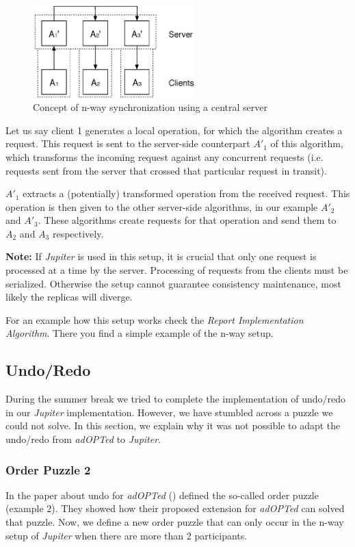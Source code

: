 \begin{figure}[htb]
 \centering
 \includegraphics[width=6.31cm,height=3.56cm]{../images/finalreport/algorithm_nway-details.eps}
 \caption{Concept of n-way synchronization using a central server}
 \label{fig:algorithm.nway-details}
\end{figure}

Let us say client 1 generates a local operation, for which the algorithm
creates a request. This request is sent to the server-side counterpart $A'_1$ of
this algorithm, which transforms the incoming request against any concurrent
requests (i.e. requests sent from the server that crossed that particular 
request in transit).

$A'_1$ extracts a (potentially) transformed operation from the received 
request. This operation is then given to the other server-side algorithms,
in our example $A'_2$ and $A'_3$. These algorithms create
requests for that operation and send them to $A_2$ and $A_3$ respectively.

\textbf{Note:} If \emph{Jupiter} is used in this setup, it is crucial that
only one request is processed at a time by the server. Processing of
requests from the clients must be serialized. Otherwise the setup cannot
guarantee consistency maintenance, most likely the replicas will diverge.

For an example how this setup works check the 
\emph{Report Implementation Algorithm}. There you find a simple example
of the n-way setup.


\subsection{Undo/Redo}
\label{sect:algorithm.undoredo}
During the summer break we tried to complete the implementation of undo/redo
in our \emph{Jupiter} implementation. However, we have stumbled across
a puzzle we could not solve. In this section, we explain why it was
not possible to adapt the undo/redo from \emph{adOPTed} to \emph{Jupiter}.

\subsubsection{Order Puzzle 2}
In the paper about undo for \emph{adOPTed} (\cite{ressel99}) defined
the so-called order puzzle (example 2). They showed how their proposed
extension for \emph{adOPTed} can solved that puzzle. Now, we define
a new order puzzle that can only occur in the n-way setup of \emph{Jupiter}
when there are more than 2 participants.

